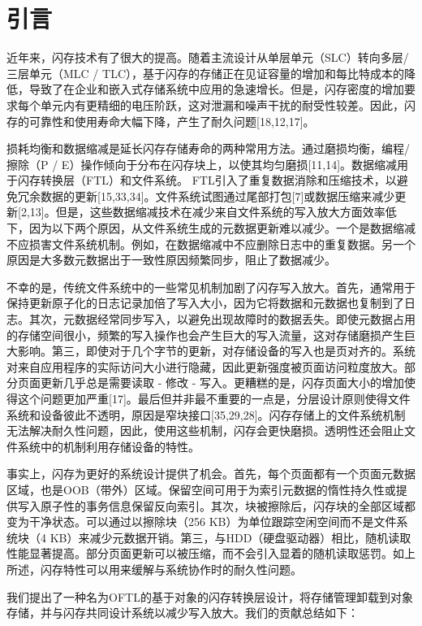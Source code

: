 \section{引言}
近年来，闪存技术有了很大的提高。随着主流设计从单层单元（SLC）转向多层/三层单元（MLC / TLC），基于闪存的存储正在见证容量的增加和每比特成本的降低，导致了在企业和嵌入式存储系统中应用的急速增长。但是，闪存密度的增加要求每个单元内有更精细的电压阶跃，这对泄漏和噪声干扰的耐受性较差。因此，闪存的可靠性和使用寿命大幅下降，产生了耐久问题[18,12,17]。

损耗均衡和数据缩减是延长闪存存储寿命的两种常用方法。通过磨损均衡，编程/擦除（P / E）操作倾向于分布在闪存块上，以使其均匀磨损[11,14]。数据缩减用于闪存转换层（FTL）和文件系统。 FTL引入了重复数据消除和压缩技术，以避免冗余数据的更新[15,33,34]。文件系统试图通过尾部打包[7]或数据压缩来减少更新[2,13]。但是，这些数据缩减技术在减少来自文件系统的写入放大方面效率低下，因为以下两个原因，从文件系统生成的元数据更新难以减少。一个是数据缩减不应损害文件系统机制。例如，在数据缩减中不应删除日志中的重复数据。另一个原因是大多数元数据出于一致性原因频繁同步，阻止了数据减少。

不幸的是，传统文件系统中的一些常见机制加剧了闪存写入放大。首先，通常用于保持更新原子化的日志记录加倍了写入大小，因为它将数据和元数据也复制到了日志。其次，元数据经常同步写入，以避免出现故障时的数据丢失。即使元数据占用的存储空间很小，频繁的写入操作也会产生巨大的写入流量，这对存储磨损产生巨大影响。第三，即使对于几个字节的更新，对存储设备的写入也是页对齐的。系统对来自应用程序的实际访问大小进行隐藏，因此更新强度被页面访问粒度放大。部分页面更新几乎总是需要读取 - 修改 - 写入。更糟糕的是，闪存页面大小的增加使得这个问题更加严重[17]。最后但并非最不重要的一点是，分层设计原则使得文件系统和设备彼此不透明，原因是窄块接口[35,29,28]。闪存存储上的文件系统机制无法解决耐久性问题，因此，使用这些机制，闪存会更快磨损。透明性还会阻止文件系统中的机制利用存储设备的特性。

事实上，闪存为更好的系统设计提供了机会。首先，每个页面都有一个页面元数据区域，也是OOB（带外）区域。保留空间可用于为索引元数据的惰性持久性或提供写入原子性的事务信息保留反向索引。其次，块被擦除后，闪存块的全部区域都变为干净状态。可以通过以擦除块（256 KB）为单位跟踪空闲空间而不是文件系统块（4 KB）来减少元数据开销。第三，与HDD（硬盘驱动器）相比，随机读取性能显著提高。部分页面更新可以被压缩，而不会引入显着的随机读取惩罚。如上所述，闪存特性可以用来缓解与系统协作时的耐久性问题。

我们提出了一种名为OFTL的基于对象的闪存转换层设计，将存储管理卸载到对象存储，并与闪存共同设计系统以减少写入放大。我们的贡献总结如下：

